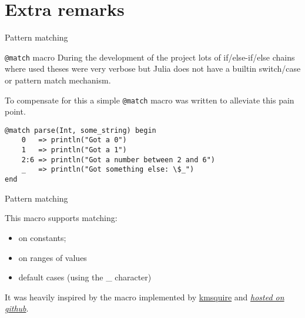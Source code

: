 \documentclass{beamer}
\begin{document}
\section{Extra remarks}
\begin{frame}[fragile]{Pattern matching}
\begin{block}{\texttt{@match} macro}
During the development of the project lots of if/else-if/else chains where used theses were
very verbose but Julia does not have a builtin switch/case or pattern match mechanism.

To compensate for this a simple \texttt{@match} macro was written to alleviate this pain point.
\end{block}
\begin{example}
\begin{verbatim}
@match parse(Int, some_string) begin
    0   => println("Got a 0")
    1   => println("Got a 1")
    2:6 => println("Got a number between 2 and 6")
    _   => println("Got something else: \$_")
end
\end{verbatim}
\end{example}
\end{frame}
\begin{frame}{Pattern matching}
\begin{block}{}
This macro supports matching:
\begin{itemize}
    \item on constants;
    \item on ranges of values
    \item default cases (using the \_ character)
\end{itemize}
It was heavily inspired by the macro implemented by \href{https://github.com/kmsquire}{kmsquire} and
\href{https://github.com/kmsquire/Match.jl}{\textit{hosted on github}}.
\end{block}
\end{frame}
\end{document}
